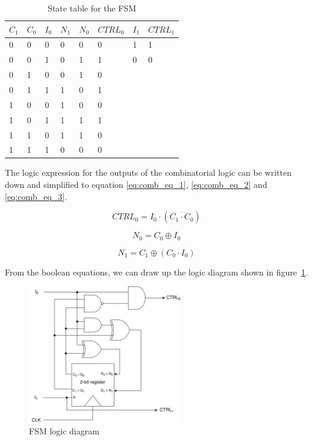 \begin{table}[H]
\caption{State table for the FSM}
\label{tab:state_table}
\centering
\begin{tabular}{|l|l|l|l|l|l||l|l|}
\hline
\rowcolor[HTML]{C0C0C0} 
$C_1$ & $C_0$ & $I_0$ & $N_1$ & $N_0$ & $CTRL_0$ & $I_1$ & $CTRL_1$\\
\hline
0  & 0  & 0  & 0   & 0   & 0 & 1 & 1\\ 
\hline
0  & 0  & 1  & 0   & 1   & 1 & 0 & 0\\ 
\hline
0  & 1  & 0  & 0   & 1   & 0 \\ 
\hline
0  & 1  & 1  & 1   & 0   & 1 \\ 
\hline
1  & 0  & 0  & 1   & 0   & 0 \\ 
\hline
1  & 0  & 1  & 1   & 1   & 1 \\ 
\hline
1  & 1  & 0  & 1   & 1   & 0 \\ 
\hline
1  & 1  & 1  & 0   & 0   & 0 \\ 
\hline

\end{tabular}
\end{table}

\noindent
The logic expression for the outputs of the combinatorial logic can be written down and simplified to equation \ref{eq:comb_eq_1}, \ref{eq:comb_eq_2} and \ref{eq:comb_eq_3}.

\begin{equation}
\label{eq:comb_eq_1}
    CTRL_0 = I_0\cdot(\overline{C_1 \cdot C_0})
\end{equation}

\begin{equation}
\label{eq:comb_eq_2}
    N_0 = C_0 \oplus I_0
\end{equation}

\begin{equation}
\label{eq:comb_eq_3}
    N_1 = C_1 \oplus (C_0 \cdot I_0)
\end{equation}

From the boolean equations, we can draw up the logic diagram shown in figure~\ref{fig:fsm_logic_diagram}.

\begin{figure}[H]
    \centering
    \includegraphics[width=0.6\textwidth]{Figures/logic diagram.png}
    \caption{FSM logic diagram}
    \label{fig:fsm_logic_diagram}
\end{figure}

